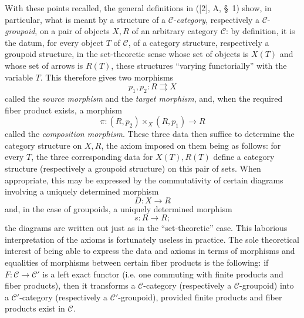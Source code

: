 With these points recalled, the general definitions in ([2], A, \S~1) show,
in particular, what is meant by a structure of a $\mathcal C$-\emph{category},
respectively a $\mathcal C$-\emph{groupoid}, on a pair of objects $X,R$ of an
arbitrary category $\mathcal C$: by definition, it is the datum, for every
object $T$ of $\mathcal C$, of a category structure, respectively a groupoid
structure, in the set-theoretic sense whose set of objects is $X(T)$ and whose
set of arrows is $R(T)$, these structures ``varying functorially'' with the
variable $T$. This therefore gives two morphisms
\[
  p_1,p_2:R\rightrightarrows X
\]
called the \emph{source morphism} and the \emph{target morphism}, and, when
the required fiber product exists, a morphism
\[
  \pi:(R,p_2)\times_X(R,p_1)\longrightarrow R
\]
called the \emph{composition morphism}. These three data then suffice to
determine the category structure on $X,R$, the axiom imposed on them being as
follows: for every $T$, the three corresponding data for $X(T),R(T)$ define a
category structure (respectively a groupoid structure) on this pair of sets.
When appropriate, this may be expressed by the commutativity of certain
diagrams involving a uniquely determined morphism
\[
  D:X\longrightarrow R
\]
and, in the case of groupoids, a uniquely determined morphism
\[
  s:R\longrightarrow R;
\]
the diagrams are written out just as in the ``set-theoretic'' case. This
laborious interpretation of the axioms is fortunately useless in practice.
The sole theoretical interest of being able to express the data and axioms in
terms of morphisms and equalities of morphisms between certain fiber products
is the following: if $F:\mathcal C\to\mathcal C'$ is a left exact functor
(i.e. one commuting with finite products and fiber products), then it
transforms a $\mathcal C$-category (respectively a $\mathcal C$-groupoid) into
a $\mathcal C'$-category (respectively a $\mathcal C'$-groupoid), provided
finite products and fiber products exist in $\mathcal C$.


